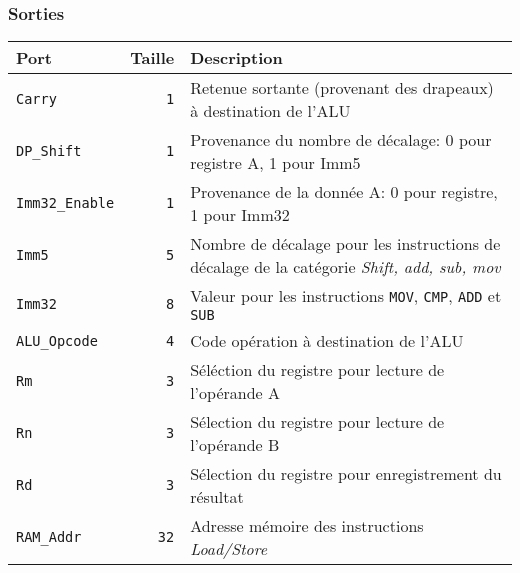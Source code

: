\documentclass{article}
\begin{document}
    \subsubsection{Sorties}

    \begin{tabular}{|l|r|l|}
        \hline
        \textbf{Port}          & \textbf{Taille} & \textbf{Description}                                                                               \\
        \hline

        \hline
        \texttt{Carry}         & \texttt{1}      & Retenue sortante (provenant des drapeaux) à destination de l'ALU                                   \\
        \hline
        \texttt{DP\_Shift}     & \texttt{1}      & Provenance du nombre de décalage: 0 pour registre A, 1 pour Imm5                                  \\
        \hline
        \texttt{Imm32\_Enable} & \texttt{1}      & Provenance de la donnée A: 0 pour registre, 1 pour Imm32                                           \\
        \hline
        \texttt{Imm5}          & \texttt{5}      & Nombre de décalage pour les instructions de décalage de la catégorie \textit{Shift, add, sub, mov} \\
        \hline
        \texttt{Imm32}         & \texttt{8}      & Valeur pour les instructions \texttt{MOV}, \texttt{CMP}, \texttt{ADD} et \texttt{SUB}    \\
        \hline
        \texttt{ALU\_Opcode}   & \texttt{4}      & Code opération à destination de l'ALU                                                              \\
        \hline
        \texttt{Rm}            & \texttt{3}      & Séléction du registre pour lecture de l'opérande A                                                 \\
        \hline
        \texttt{Rn}            & \texttt{3}      & Sélection du registre pour lecture de l'opérande B                                                 \\
        \hline
        \texttt{Rd}            & \texttt{3}      & Sélection du registre pour enregistrement du résultat                                              \\
        \hline
        \texttt{RAM\_Addr}     & \texttt{32}     & Adresse mémoire des instructions \textit{Load/Store}                                               \\

\end{tabular}
\end{document}
